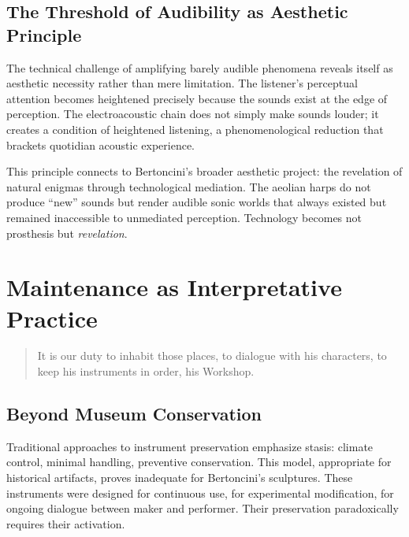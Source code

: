\subsection{The Threshold of Audibility as Aesthetic Principle}

The technical challenge of amplifying barely audible phenomena reveals itself 
as aesthetic necessity rather than mere limitation. The listener's perceptual 
attention becomes heightened precisely because the sounds exist at the edge of 
perception. The electroacoustic chain does not simply make sounds louder; it 
creates a condition of heightened listening, a phenomenological reduction that 
brackets quotidian acoustic experience.

This principle connects to Bertoncini's broader aesthetic project: the 
revelation of natural enigmas through technological mediation. The aeolian 
harps do not produce ``new'' sounds but render audible sonic worlds that always 
existed but remained inaccessible to unmediated perception. Technology becomes 
not prosthesis but \emph{revelation}.

\section{Maintenance as Interpretative Practice}

\begin{quote}
  \begin{sf}
    \small
    It is our duty to inhabit those places, to dialogue with his characters, 
    to keep his instruments in order, his Workshop. \cite{silvi2025botteghe}
  \end{sf}
\end{quote}

\subsection{Beyond Museum Conservation}

Traditional approaches to instrument preservation emphasize stasis: climate 
control, minimal handling, preventive conservation. This model, appropriate for 
historical artifacts, proves inadequate for Bertoncini's sculptures. These 
instruments were designed for continuous use, for experimental modification, 
for ongoing dialogue between maker and performer. Their preservation paradoxically 
requires their activation.


